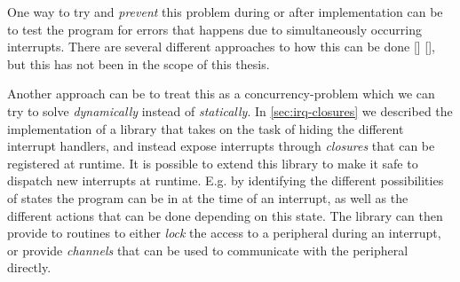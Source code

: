One way to try and \emph{prevent} this problem during or after implementation can be to test the program for errors that happens due to simultaneously occurring interrupts.
There are several different approaches to how this can be done [] [], but this has not been in the scope of this thesis.

Another approach can be to treat this as a concurrency-problem which we can try to solve \emph{dynamically} instead of \emph{statically}.
In \autoref{sec:irq-closures} we described the implementation of a library that takes on the task of hiding the different interrupt handlers, and instead expose interrupts through \emph{closures} that can be registered at runtime.
It is possible to extend this library to make it safe to dispatch new interrupts at runtime.
E.g. by identifying the different possibilities of states the program can be in at the time of an interrupt, as well as the different actions that can be done depending on this state.
The library can then provide to routines to either \emph{lock} the access to a peripheral during an interrupt, or provide \emph{channels} that can be used to communicate with the peripheral directly.